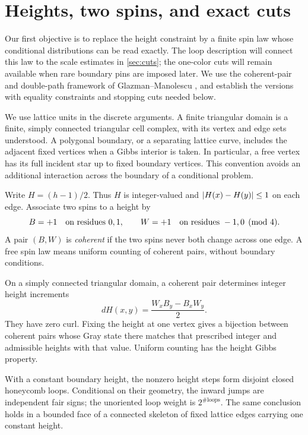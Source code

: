 \section{Heights, two spins, and exact cuts}\label{sec:spin}

Our first objective is to replace the height constraint by a finite spin
law whose conditional distributions can be read exactly.  The loop
description will connect this law to the scale estimates in
\cref{sec:cuts}; the one-color cuts will remain available when rare
boundary pins are imposed later.
We use the coherent-pair and double-path framework of
Glazman--Manolescu \cite[Proposition~1.4 and Sections~2.1--2.3]{GM2021},
and establish the versions with equality constraints and stopping cuts
needed below.

We use lattice units in the discrete arguments.  A finite triangular domain
is a finite, simply connected triangular cell complex, with its vertex and
edge sets understood.  A polygonal boundary, or a separating lattice curve,
includes the adjacent fixed vertices when a Gibbs interior is taken.  In
particular, a free vertex has its full incident star up to fixed boundary
vertices.  This convention avoids an additional interaction across the
boundary of a conditional problem.

Write $H=(h-1)/2$.  Thus $H$ is integer-valued and
$\lvert H(x)-H(y)\rvert\leq1$ on each edge.  Associate two spins to a height by
\begin{equation}\label{eq:gray-code}
 B=+1\quad\hbox{on residues }0,1,\qquad
 W=+1\quad\hbox{on residues }-1,0\pmod4.
\end{equation}
A pair $(B,W)$ is \emph{coherent} if the two spins never both change across
one edge.  A free spin law means uniform counting of coherent pairs,
without boundary conditions.

\begin{lemma}\label{lem:gray}
On a simply connected triangular domain, a coherent pair determines
integer height increments
\begin{equation}\label{eq:height-increment}
 dH(x,y)=\frac{W_xB_y-B_xW_y}{2}.
\end{equation}
They have zero curl.  Fixing the height at one vertex gives a bijection
between coherent pairs whose Gray state there matches that prescribed
integer and admissible heights with that value.  Uniform counting has the
height Gibbs property.

With a constant boundary height, the nonzero height steps form disjoint
closed honeycomb loops.  Conditional on their geometry, the inward jumps
are independent fair signs; the unoriented loop weight is
$2^{\#\mathrm{loops}}$.  The same conclusion holds in a bounded face of a
connected skeleton of fixed lattice edges carrying one constant height.
\end{lemma}

